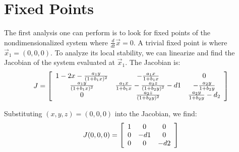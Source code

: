 \documentclass[%
        final,
        notitlepage,
        narroweqnarray,
        inline,
        ]{ieee}
\begin{document}

\section{Fixed Points}

The first analysis one can perform is to look for fixed points of the nondimensionalized system where $\frac{d}{dt}\vec{x} = 0$. A trivial fixed point is where $\vec{x}_1 = (0,0,0)$. To analyze its local stability, we can linearize and find the Jacobian of the system evaluated at $\vec{x}_1$. The Jacobian is:
\begin{equation}
J = \left[ \begin{array}{ c c c}
1 - 2x - \frac{a_1 y}{(1 + b_1 x)^2} & - \frac{a_1 x }{1 + b_1 x} & 0 \\
\frac{a_1 y}{(1 + b_1 x)^2} & \frac{a_1 x}{1 + b_1 x} - \frac{a_2 z}{(1 + b_2 y)^2} - d1 & - \frac{a_2 y}{1 + b_2 y} \\
0 & \frac{a_2 z}{(1 + b_2 y)^2} & \frac{a_2 y}{1 + b_2 y} - d_2 
\end{array} \right]
\end{equation}

Substituting $(x,y,z) = (0,0,0)$ into the Jacobian, we find:
\begin{equation}
J(0,0,0) = \left[ \begin{array}{c c c}
1 & 0 & 0 \\
0 & -d1 & 0 \\
0 & 0 & - d2
\end{array} \right]
\end{equation}
\end{document}
